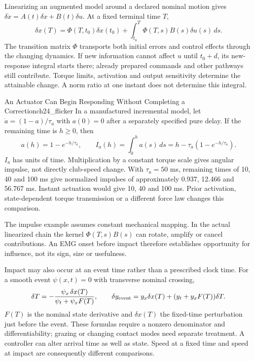Linearizing an augmented model around a declared nominal motion gives $\delta\dot x=A(t)\delta x+B(t)\delta u$. At a fixed terminal time $T$,
\[
\delta x(T)=\Phi(T,t_0)\delta x(t_0)
+\int_{t_0}^T\Phi(T,s)B(s)\delta u(s)\,ds.
\]
The transition matrix $\Phi$ transports both initial errors and control effects through the changing dynamics. If new information cannot affect $u$ until $t_0+d$, its new-response integral starts there; already prepared commands and other pathways still contribute. Torque limits, activation and output sensitivity determine the attainable change. A norm ratio at one instant does not determine this integral.

\begin{example}{An Actuator Can Begin Responding Without Completing a Correction}{ch24_flicker}
In a manufactured incremental model, let $\dot a=(1-a)/\tau_a$ with $a(0)=0$ after a separately specified pure delay. If the remaining time is $h\geq0$, then
\[
a(h)=1-e^{-h/\tau_a},\qquad
I_a(h)=\int_0^h a(s)\,ds
=h-\tau_a(1-e^{-h/\tau_a}).
\]
$I_a$ has units of time. Multiplication by a constant torque scale gives angular impulse, not directly club-speed change. With $\tau_a=50$ ms, remaining times of 10, 40 and 100 ms give normalized impulses of approximately 0.937, 12.466 and 56.767 ms. Instant actuation would give 10, 40 and 100 ms. Prior activation, state-dependent torque transmission or a different force law changes this comparison.
\end{example}

The impulse example assumes constant mechanical mapping. In the actual linearized chain the kernel $\Phi(T,s)B(s)$ can rotate, amplify or cancel contributions. An EMG onset before impact therefore establishes opportunity for influence, not its sign, size or usefulness.

Impact may also occur at an event time rather than a prescribed clock time. For a smooth event $\psi(x,t)=0$ with transverse nominal crossing,
\[
\delta T=-\frac{\psi_x\,\delta x(T)}{\psi_t+\psi_x F(T)},\qquad
\delta y_{\rm event}=y_x\delta x(T)+(y_t+y_xF(T))\delta T.
\]
$F(T)$ is the nominal state derivative and $\delta x(T)$ the fixed-time perturbation just before the event. These formulas require a nonzero denominator and differentiability; grazing or changing contact modes need separate treatment. A controller can alter arrival time as well as state. Speed at a fixed time and speed at impact are consequently different comparisons.

